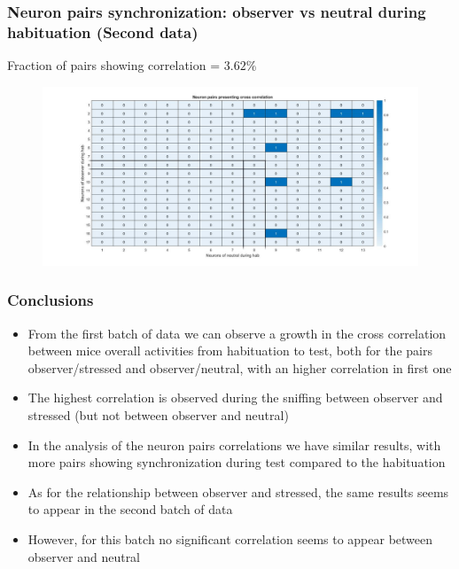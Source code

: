 \documentclass{beamer}
\begin{document}
\begin{frame}
\frametitle{Neuron pairs synchronization: observer vs neutral during habituation (Second data)}


Fraction of pairs showing correlation = $3.62 \%$


\begin{figure}[H]
\begin{center}
\hspace*{-1cm}
\includegraphics[scale=.30]{neur_corr_neut_hab2.jpg} 
\end{center}  


\end{figure}


\end{frame}


\begin{frame}
\frametitle{Conclusions}

\begin{itemize}
	
	\item From the first batch of data we can observe a growth in the cross correlation between mice overall activities from habituation to test, both for the pairs observer/stressed and observer/neutral, with an higher correlation in first one
	
	\item The highest correlation is observed during the sniffing between observer and stressed (but not between observer and neutral)
	
	\item In the analysis of the neuron pairs correlations we have similar results, with more pairs showing synchronization during test compared to the habituation
	
	\item As for the relationship between observer and stressed, the same results seems to appear in the second batch of data
	
	\item However, for this batch no significant correlation seems to appear between observer and neutral
\end{itemize}
\end{frame}
\end{document}
